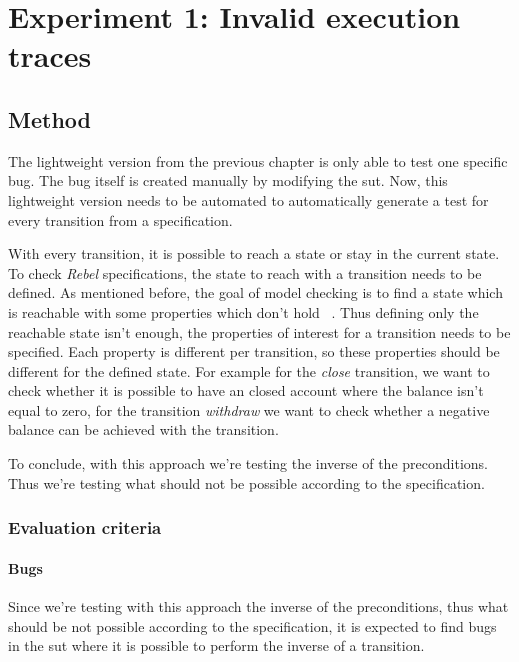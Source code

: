 \chapter{Experiment 1: Invalid execution traces}\label{sec:ch4}


\section{Method}

The lightweight version from the previous chapter is only able to test one specific
bug. The bug itself is created manually by modifying the \gls{sut}. Now,
this lightweight version needs to be automated to automatically generate a test
for every transition from a specification.

With every transition, it is possible to reach a state or stay in the current
state. To check \textit{Rebel} specifications, the state to reach with a transition needs
to be defined. As mentioned before, the goal of model checking is to find a
state which is reachable with some properties which don't hold
~\cite[p.5]{stoel_storm_vinju_bosman_2016}. Thus defining only the reachable
state isn't enough, the properties of interest for a transition needs to be
specified. Each property is different per transition, so these properties should
be different for the defined state. For example for the \textit{close}
transition, we want to check whether it is possible to have an closed account
where the balance isn't equal to zero, for the transition \textit{withdraw} we
want to check whether a negative balance can be achieved with the transition.

To conclude, with this approach we're testing the inverse of the preconditions. Thus we're testing
what should not be possible according to the specification.

\subsection{Evaluation criteria}\label{sec:ch4-eval-criteria}

\subsubsection{Bugs}
Since we're testing with this approach the inverse of the preconditions, thus
what should be not possible according to the specification, it is expected to
find bugs in the \gls{sut} where it is possible to perform the inverse of a
transition.

